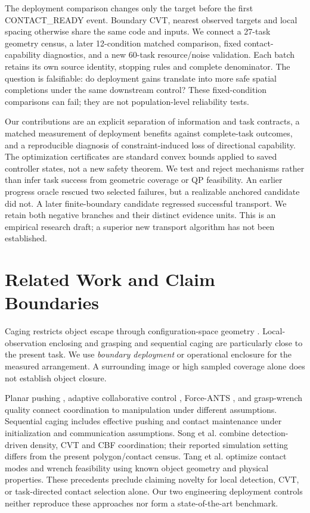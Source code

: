 \documentclass[letterpaper,10pt,conference]{ieeeconf}
\begin{document}
The deployment comparison changes only the target before the first CONTACT\_READY event. Boundary CVT, nearest observed targets and local spacing otherwise share the same code and inputs. We connect a 27-task geometry census, a later 12-condition matched comparison, fixed contact-capability diagnostics, and a new 60-task resource/noise validation. Each batch retains its own source identity, stopping rules and complete denominator. The question is falsifiable: do deployment gains translate into more safe spatial completions under the same downstream control? These fixed-condition comparisons can fail; they are not population-level reliability tests.

Our contributions are an explicit separation of information and task contracts, a matched measurement of deployment benefits against complete-task outcomes, and a reproducible diagnosis of constraint-induced loss of directional capability. The optimization certificates are standard convex bounds applied to saved controller states, not a new safety theorem. We test and reject mechanisms rather than infer task success from geometric coverage or QP feasibility. An earlier progress oracle rescued two selected failures, but a realizable anchored candidate did not. A later finite-boundary candidate regressed successful transport. We retain both negative branches and their distinct evidence units. This is an empirical research draft; a superior new transport algorithm has not been established.

\section{Related Work and Claim Boundaries}
Caging restricts object escape through configuration-space geometry \cite{pereira2004,wang2025caging}. Local-observation enclosing and grasping \cite{kobayashi2012} and sequential caging \cite{vardharajan2021} are particularly close to the present task. We use \emph{boundary deployment} or operational enclosure for the measured arrangement. A surrounding image or high sampled coverage alone does not establish object closure.

Planar pushing \cite{tang2024,chai2022}, adaptive collaborative control \cite{yan2021,culbertson2021}, Force-ANTS \cite{wang2016force}, and grasp-wrench quality \cite{ferrari1992} connect coordination to manipulation under different assumptions. Sequential caging includes effective pushing and contact maintenance under initialization and communication assumptions. Song et al. combine detection-driven density, CVT and CBF coordination; their reported simulation setting differs from the present polygon/contact census. Tang et al. optimize contact modes and wrench feasibility using known object geometry and physical properties. These precedents preclude claiming novelty for local detection, CVT, or task-directed contact selection alone. Our two engineering deployment controls neither reproduce these approaches nor form a state-of-the-art benchmark.
\end{document}
